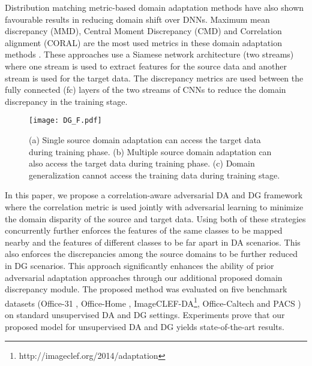\documentclass[review]{elsarticle}
\begin{document}
Distribution matching metric-based domain adaptation methods have also shown favourable results in reducing domain shift over DNNs. Maximum mean discrepancy (MMD), Central Moment Discrepancy (CMD) and Correlation alignment (CORAL) are the most used metrics in these domain adaptation methods \cite{DBLP:conf/icml/LongC0J15,DBLP:journals/corr/ZellingerGLNS17,dcoral}. These approaches use a Siamese network architecture (two streams) where one stream is used to extract features for the source data and another stream is used for the target data. The discrepancy metrics are used between the fully connected (fc) layers of the two streams of CNNs to reduce the domain discrepancy in the training stage.   




\begin{figure}
\begin{center}
\texttt{[image: DG\_F.pdf]}
\end{center}
   \caption{ (a) Single source domain adaptation can access the target data during training phase. (b) Multiple source domain adaptation can also access the target data during training phase. (c) Domain generalization cannot access the training data during training stage.}
\label{fig:DG_DA}
\end{figure}


In this paper, we propose a correlation-aware adversarial DA and DG framework where the correlation metric is used jointly with adversarial learning to minimize the domain disparity of the source and target data. Using both of these strategies concurrently further enforces the features of the same classes to be mapped nearby and the features of different classes to be far apart in DA scenarios. This also enforces the discrepancies among the source domains to be further reduced in DG scenarios. This approach significantly enhances the ability of prior adversarial adaptation approaches through our additional proposed domain discrepancy module. The proposed method was evaluated on five benchmark datasets (Office-31 \cite{Saenko:2010:AVC:1888089.1888106}, Office-Home  \cite{venkateswara2017Deep}, ImageCLEF-DA\footnote{http://imageclef.org/2014/adaptation}, Office-Caltech \cite{DBLP:conf/cvpr/GongSSG12} and PACS \cite{8237853}) on standard unsupervised DA and DG settings. Experiments prove that our proposed model for unsupervised DA and DG yields state-of-the-art results.
\end{document}
